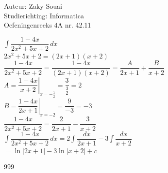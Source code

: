\documentclass[a4paper]{article}
\begin{document}
  
\noindent \large Auteur: Zaky Souai \\
\noindent \large Studierichting:  Informatica\\
\noindent \large Oefeningenreeks 4A nr. 42.11\\

\bigskip

\normalsize

$\displaystyle \int \dfrac{1-4x}{2x^2+5x+2}\,dx$\\

$\displaystyle 2x^2+5x+2=(2x+1)(x+2)$\\

$\displaystyle \dfrac{1-4x}{2x^2+5x+2}=\dfrac{1-4x}{(2x+1)(x+2)}=\dfrac{A}{2x+1}+\dfrac{B}{x+2}$\\

$\displaystyle A=\left.\dfrac{1-4x}{x+2}\right|_{x=-\frac{1}{2}}=\dfrac{3}{\frac{3}{2}}=2$\\

$\displaystyle B=\left.\dfrac{1-4x}{2x+1}\right|_{x=-2}=\dfrac{9}{-3}=-3$\\

$\displaystyle \dfrac{1-4x}{2x^2+5x+2}=\dfrac{2}{2x+1}-\dfrac{3}{x+2}$\\

$\displaystyle \int \dfrac{1-4x}{2x^2+5x+2}\,dx=2\int\dfrac{dx}{2x+1}-3\int\dfrac{dx}{x+2}$\\

$\displaystyle =\ln|2x+1|-3\ln|x+2|+c$


\begin{thebibliography}{999}
\end{thebibliography}
\end{document}
